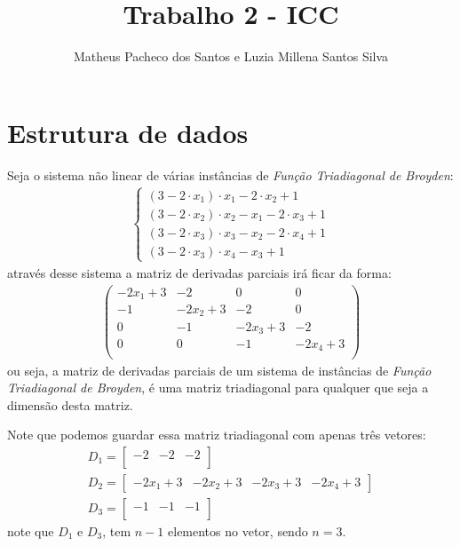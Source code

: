 \documentclass[10pt,a4paper]{article}
\author{Matheus Pacheco dos Santos e Luzia Millena Santos Silva}
\title{Trabalho 2 - ICC}
\begin{document}
	\maketitle
	
	\section{Estrutura de dados}
	Seja o sistema não linear de várias instâncias de \textit{Função Triadiagonal de Broyden}:
	\begin{align*}
		\begin{cases}
			(3-2\cdot x_{1})\cdot x_{1}-2\cdot x_{2}+1 \\
			(3-2\cdot x_{2})\cdot x_{2}-x_{1}-2 \cdot x_{3}+1 \\
			(3-2\cdot x_{3})\cdot x_{3}-x_{2} -2 \cdot x_{4} + 1 \\
			(3-2\cdot x_{3})\cdot x_{4}-x_{3} + 1 
		\end{cases}
	\end{align*}
	através desse sistema a matriz de derivadas parciais irá ficar da forma:
	\begin{align*}
		\begin{pmatrix}
			-2x_{1} + 3 & -2 & 0 & 0 \\
			-1 & - 2x_{2} + 3 & - 2 & 0 \\
			0 & - 1 & - 2x_{3} + 3 & -2 \\
			0 & 0 & - 1 & - 2x_{4} + 3 \\
		\end{pmatrix}
	\end{align*}
	ou seja, a matriz de derivadas parciais de um sistema de instâncias de \textit{Função Triadiagonal de Broyden}, é uma matriz triadiagonal para qualquer que seja a dimensão desta matriz. 
	
	Note que podemos guardar essa matriz triadiagonal com apenas três vetores:
	\begin{align*}
		& D_{1} = 
		\begin{bmatrix}
		 -2 & -2  & -2 \\
		\end{bmatrix} & \\
		& D_{2} = 
		\begin{bmatrix}
			-2x_{1} + 3 & - 2x_{2} + 3 & - 2x_{3} + 3 & - 2x_{4} + 3
		\end{bmatrix} & \\
		& D_{3} = 
		\begin{bmatrix}
		-1 & -1  & -1 \\
		\end{bmatrix} & 
	\end{align*}
	note que $ D_{1} $ e $ D_{3} $, tem $ n - 1 $ elementos no vetor, sendo $ n = 3 $.
	
\end{document}
